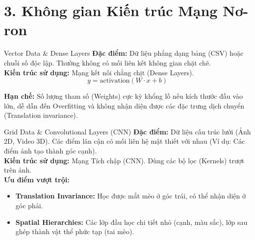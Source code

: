 \documentclass[aspectratio=169]{beamer}
\begin{document}
\section{3. Không gian Kiến trúc Mạng Nơ-ron}

\begin{frame}{Vector Data \& Dense Layers}
    \textbf{Đặc điểm:} Dữ liệu phẳng dạng bảng (CSV) hoặc chuỗi số độc lập. Thường không có mối liên kết không gian chặt chẽ. \\
    
    \vspace{0.5cm}
    \textbf{Kiến trúc sử dụng:} Mạng kết nối chằng chịt (Dense Layers). \\
    \begin{equation*}
        y = \text{activation}(W \cdot x + b)
    \end{equation*}
    
    \textbf{Hạn chế:} Số lượng tham số (Weights) cực kỳ khổng lồ nếu kích thước đầu vào lớn, dễ dẫn đến Overfitting và không nhận diện được các đặc trưng dịch chuyển (Translation invariance).
\end{frame}

\begin{frame}{Grid Data \& Convolutional Layers (CNN)}
    \textbf{Đặc điểm:} Dữ liệu cấu trúc lưới (Ảnh 2D, Video 3D). Các điểm lân cận có mối liên hệ mật thiết với nhau (Ví dụ: Các điểm ảnh tạo thành góc cạnh). \\
    
    \vspace{0.5cm}
    \textbf{Kiến trúc sử dụng:} Mạng Tích chập (CNN). Dùng các bộ lọc (Kernels) trượt trên ảnh. \\
    
    \textbf{Ưu điểm vượt trội:}
    \begin{itemize}
        \item \textbf{Translation Invariance:} Học được mắt mèo ở góc trái, có thể nhận diện ở góc phải.
        \item \textbf{Spatial Hierarchies:} Các lớp đầu học chi tiết nhỏ (cạnh, màu sắc), lớp sau ghép thành vật thể phức tạp (tai mèo).
    \end{itemize}
\end{frame}
\end{document}
